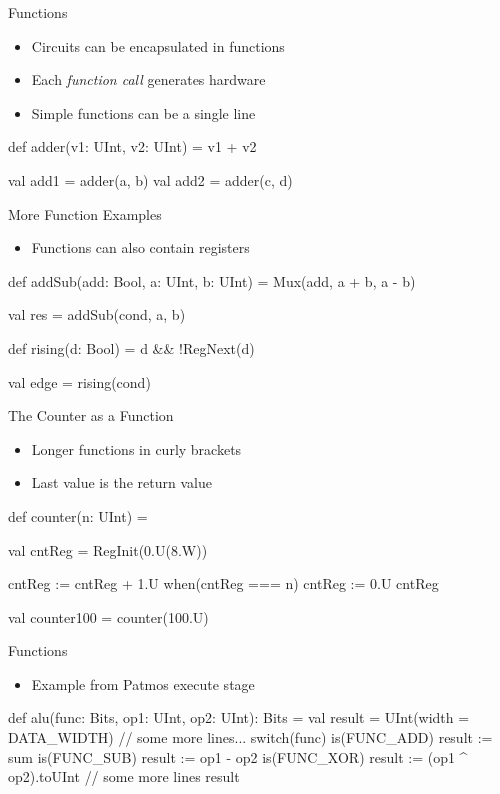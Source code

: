 \begin{frame}[fragile]{Functions}
\begin{itemize}
\item Circuits can be encapsulated in functions
\item Each \emph{function call} generates hardware
\item Simple functions can be a single line
\end{itemize}
\begin{chisel}
  def adder(v1: UInt, v2: UInt) = v1 + v2
  
  val add1 = adder(a, b)
  val add2 = adder(c, d)
\end{chisel}
\end{frame}

\begin{frame}[fragile]{More Function Examples}
\begin{itemize}
\item Functions can also contain registers
\end{itemize}
\begin{chisel}
  def addSub(add: Bool, a: UInt, b: UInt) =
    Mux(add, a + b, a - b)

  val res = addSub(cond, a, b)

  def rising(d: Bool) = d && !RegNext(d)

  val edge = rising(cond)
\end{chisel}
\end{frame}

\begin{frame}[fragile]{The Counter as a Function}
\begin{itemize}
\item Longer functions in curly brackets
\item Last value is the return value
\end{itemize}
\begin{chisel}
def counter(n: UInt) = {
  
  val cntReg = RegInit(0.U(8.W))
  
  cntReg := cntReg + 1.U
  when(cntReg === n) {
    cntReg := 0.U
  }
  cntReg
}

val counter100 = counter(100.U)
\end{chisel}
\end{frame}


\begin{frame}[fragile]{Functions}
\begin{itemize}
\item Example from Patmos execute stage
\end{itemize}
\begin{chisel}
def alu(func: Bits, op1: UInt, op2: UInt): Bits = {
  val result = UInt(width = DATA_WIDTH)
  // some more lines...
  switch(func) {
    is(FUNC_ADD) { result := sum }
    is(FUNC_SUB) { result := op1 - op2 }
    is(FUNC_XOR) { result := (op1 ^ op2).toUInt }
    // some more lines
  }
  result
}
\end{chisel}
\end{frame}

